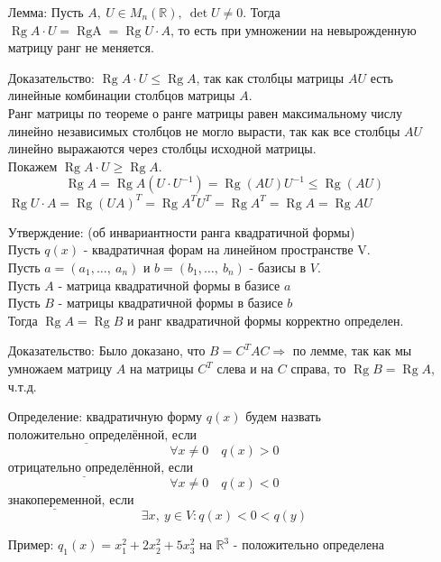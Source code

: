 \documentclass[12pt, letterpaper, twoside]{article}
\begin{document}
    \begin{enumerate}
        \item[Лемма:] Пусть $A,\ U\in M_n(\mathbb{R}),\ \det U\neq 0$. Тогда $\operatorname{Rg} A\cdot U = \operatorname{Rg A} = \operatorname{Rg} U\cdot A$, то есть при умножении на невырожденную матрицу ранг не меняется.
        \item[Доказательство:] $\operatorname{Rg} A\cdot U \leq \operatorname{Rg} A$, так как столбцы матрицы $AU$ есть линейные комбинации столбцов матрицы $A$.\\
        Ранг матрицы по теореме о ранге матрицы равен максимальному числу линейно независимых столбцов не могло вырасти, так как все столбцы $AU$ линейно выражаются через столбцы исходной матрицы.\\
        Покажем $\operatorname{Rg} A\cdot U\geq \operatorname{Rg} A$. \[\operatorname{Rg} A = \operatorname{Rg} A(U\cdot U^{-1}) = \operatorname{Rg} (AU)U^{-1} \leq \operatorname{Rg} (AU)\]
        $\operatorname{Rg} U\cdot A = \operatorname{Rg} (UA)^T = \operatorname{Rg} A^T U^T = \operatorname{Rg} A^T = \operatorname{Rg} A = \operatorname{Rg} A U$
        \item[Утверждение:] (об инвариантности ранга квадратичной формы)\\
        Пусть $q(x)$ - квадратичная форам на линейном пространстве V.\\
        Пусть $a = (a_1,\dots,\ a_n)$ и $b = (b_1,\dots,\ b_n)$ - базисы в $V$.\\
        Пусть $A$ - матрица квадратичной формы в базисе $a$\\
        Пусть $B$ - матрицы квадратичной формы в базисе $b$\\
        Тогда $\operatorname{Rg} A = \operatorname{Rg} B$ и ранг квадратичной формы корректно определен.
        \item[Доказательство:] Было доказано, что $B = C^T AC\Rightarrow$ по лемме, так как мы умножаем матрицу $A$ на матрицы $C^T$ слева и на $C$ справа, то $\operatorname{Rg} B = \operatorname{Rg} A$, ч.т.д.\\
        \item[Определение:] квадратичную форму $q(x)$ будем назвать $\underline{\text{положительно определённой}}$, если \[\forall x \neq 0\quad q(x) > 0\]
        $\underline{\text{отрицательно определённой}}$, если \[\forall x\neq 0\quad q(x) < 0\]
        $\underline{\text{знакопеременной}}$, если \[\exists x,\ y\in V: q(x) < 0 < q(y)\] 
        \item[Пример:] $q_1(x) = x_1^2 + 2x^2_2 + 5x_3^2$ на $\mathbb{R}^3$ - положительно определена\\

\end{enumerate}
\end{document}
